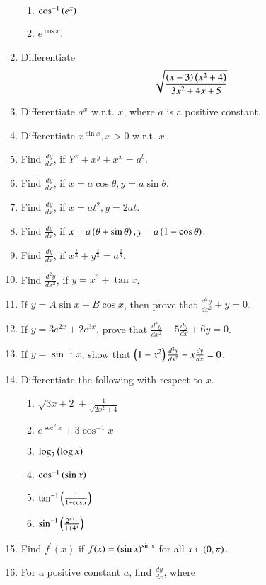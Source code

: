 \begin{enumerate}[label=\arabic*.,ref=\thesubsection.\theenumi]
\begin{enumerate}
\item $\cos ^{-1}\left(e^x\right)$
\item $e^{\cos x}$.
\end{enumerate}
%
\item Differentiate
%
\begin{align}
\sqrt{\frac{\left(x-3\right)\left(x^2+4\right)}{3x^2+4x+5}}
\end{align}
\item Differentiate $a^x$ w.r.t. $x$, where $a$ is a positive constant.
\item Differentiate $x^{\sin x}, x > 0$ w.r.t. $x$.
\item Find $\frac{dy}{dx}$, if $Y^x+x^y+x^x = a^b$.
\item Find $\frac{dy}{dx}$, if $x = a \cos \theta, y = a\sin \theta$.
\item Find $\frac{dy}{dx}$, if $x = a t^2, y = 2at$.
\item Find $\frac{dy}{dx}$, if $x = a \left(\theta+\sin \theta\right), y = a\left(1-\cos \theta\right)$.
\item Find $\frac{dy}{dx}$, if $x^{\frac{2}{3}}+y^{\frac{2}{3}} = a^{\frac{2}{3}}$.
\item Find $\frac{d^2y}{dx^2}$, if $y = x^3+\tan x$.
\item If $y = A \sin x + B \cos x$, then prove that  $\frac{d^2y}{dx^2} + y = 0$.
\item If $y = 3e^{2x}+2e^{3x}$, prove that $\frac{d^2y}{dx^2} - 5\frac{dy}{dx}+6y = 0$.
\item If $y = \sin ^{-1}x$, show that $\left(1-x^2\right)\frac{d^2y}{dx^2} - x\frac{dy}{dx} = 0$.
\item Differentiate the following with respect to $x$.
%
\begin{enumerate}
\item  $\sqrt{3x+2}+ \frac{1}{\sqrt{2x^2+4}}$
\item  $e^{\sec^2 x} + 3\cos^{-1} x$
\item $\log_7\left(\log x\right)$
\item $\cos ^{-1}\left(\sin x\right)$
\item $\tan ^{-1}\left(\frac{1}{1+\cos x}\right)$
\item $\sin^{-1}\left(\frac{2^{x+1}}{1+4^x}\right)$
\end{enumerate}
%
\item Find $f^{\prime}(x)$ if $f(x) = \left(\sin x\right)^{\sin x}$ for all $x \in \left(0, \pi\right)$.
\item For a positive constant $a$, find $\frac{dy}{dx}$, where 
%
\begin{align}

\end{align}
\end{enumerate}
